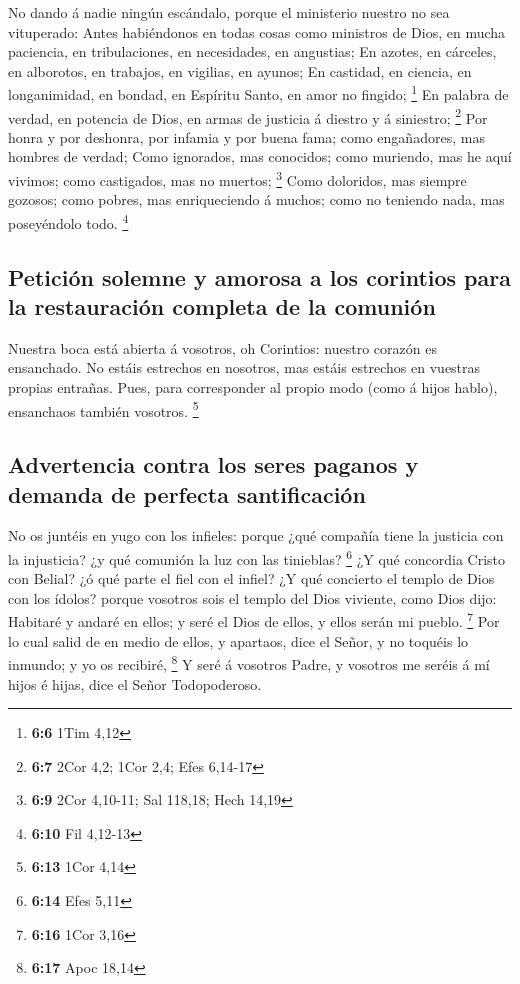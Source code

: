 No dando á nadie ningún escándalo, porque el ministerio
nuestro no sea vituperado:  Antes habiéndonos en todas cosas
como ministros de Dios, en mucha paciencia, en tribulaciones, en
necesidades, en angustias;  En azotes, en cárceles, en
alborotos, en trabajos, en vigilias, en ayunos;  En
castidad, en ciencia, en longanimidad, en bondad, en Espíritu Santo, en
amor no fingido; \footnote{\textbf{6:6} 1Tim 4,12}  En
palabra de verdad, en potencia de Dios, en armas de justicia á diestro y
á siniestro; \footnote{\textbf{6:7} 2Cor 4,2; 1Cor 2,4; Efes 6,14-17}
 Por honra y por deshonra, por infamia y por buena fama;
como engañadores, mas hombres de verdad;  Como ignorados,
mas conocidos; como muriendo, mas he aquí vivimos; como castigados, mas
no muertos; \footnote{\textbf{6:9} 2Cor 4,10-11; Sal 118,18; Hech 14,19}
 Como doloridos, mas siempre gozosos; como pobres, mas
enriqueciendo á muchos; como no teniendo nada, mas poseyéndolo todo.
\footnote{\textbf{6:10} Fil 4,12-13}

\hypertarget{peticiuxf3n-solemne-y-amorosa-a-los-corintios-para-la-restauraciuxf3n-completa-de-la-comuniuxf3n}{%
\subsection{Petición solemne y amorosa a los corintios para la
restauración completa de la
comunión}\label{peticiuxf3n-solemne-y-amorosa-a-los-corintios-para-la-restauraciuxf3n-completa-de-la-comuniuxf3n}}

 Nuestra boca está abierta á vosotros, oh Corintios:
nuestro corazón es ensanchado.  No estáis estrechos en
nosotros, mas estáis estrechos en vuestras propias entrañas.
 Pues, para corresponder al propio modo (como á hijos
hablo), ensanchaos también vosotros. \footnote{\textbf{6:13} 1Cor 4,14}

\hypertarget{advertencia-contra-los-seres-paganos-y-demanda-de-perfecta-santificaciuxf3n}{%
\subsection{Advertencia contra los seres paganos y demanda de perfecta
santificación}\label{advertencia-contra-los-seres-paganos-y-demanda-de-perfecta-santificaciuxf3n}}

 No os juntéis en yugo con los infieles: porque ¿qué
compañía tiene la justicia con la injusticia? ¿y qué comunión la luz con
las tinieblas? \footnote{\textbf{6:14} Efes 5,11}  ¿Y qué
concordia Cristo con Belial? ¿ó qué parte el fiel con el infiel?
 ¿Y qué concierto el templo de Dios con los ídolos? porque
vosotros sois el templo del Dios viviente, como Dios dijo: Habitaré y
andaré en ellos; y seré el Dios de ellos, y ellos serán mi pueblo.
\footnote{\textbf{6:16} 1Cor 3,16}  Por lo cual salid de en
medio de ellos, y apartaos, dice el Señor, y no toquéis lo inmundo; y yo
os recibiré, \footnote{\textbf{6:17} Apoc 18,14}  Y seré á
vosotros Padre, y vosotros me seréis á mí hijos é hijas, dice el Señor
Todopoderoso.

